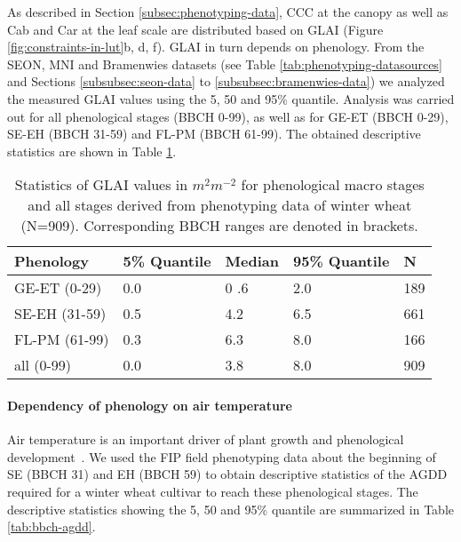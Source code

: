As described in Section \ref{subsec:phenotyping-data}, CCC at the canopy as well as Cab and Car at the leaf scale are distributed based on GLAI (Figure \ref{fig:constraints-in-lut}b, d, f). GLAI in turn depends on phenology. From the SEON, MNI and Bramenwies datasets (see Table \ref{tab:phenotyping-datasources} and Sections \ref{subsubsec:seon-data} to \ref{subsubsec:bramenwies-data}) we analyzed the measured GLAI values using the 5, 50 and 95\% quantile. Analysis was carried out for all phenological stages (BBCH 0-99), as well as for GE-ET (BBCH 0-29), SE-EH (BBCH 31-59) and FL-PM (BBCH 61-99). The obtained descriptive statistics are shown in Table \ref{tab:glai-data}.

\begin{table}[H]
\caption{Statistics of GLAI values in $m^2 m^{-2}$ for phenological macro stages and all stages derived from phenotyping data of winter wheat (N=909). Corresponding BBCH ranges are denoted in brackets.}
\label{tab:glai-data}
\begin{tabularx}{\textwidth}{p{4cm}p{1.8cm}p{1.8cm}p{1.8cm}p{0.8cm}}
\toprule
\textbf{Phenology} & \textbf{5\% Quantile} & \textbf{Median} & \textbf{95\% Quantile} & \textbf{N} \\ \midrule
GE-ET (0-29)  & 0.0   & 0 .6 &  2.0 & 189  \\
SE-EH (31-59)   & 0.5  & 4.2 & 6.5  & 661  \\
FL-PM (61-99)   & 0.3 & 6.3 &  8.0 & 166  \\
all (0-99)   & 0.0  &  3.8  & 8.0  & 909  \\ \bottomrule
\end{tabularx}
\end{table}

\paragraph{Dependency of phenology on air temperature}

Air temperature is an important driver of plant growth and phenological development~\citep{parent_temperature_2012, roth_high-throughput_2022}. We used the FIP field phenotyping data about the beginning of SE (BBCH 31) and EH (BBCH 59) to obtain descriptive statistics of the AGDD required for a winter wheat cultivar to reach these phenological stages. The descriptive statistics showing the 5, 50 and 95\% quantile are summarized in Table \ref{tab:bbch-agdd}.


